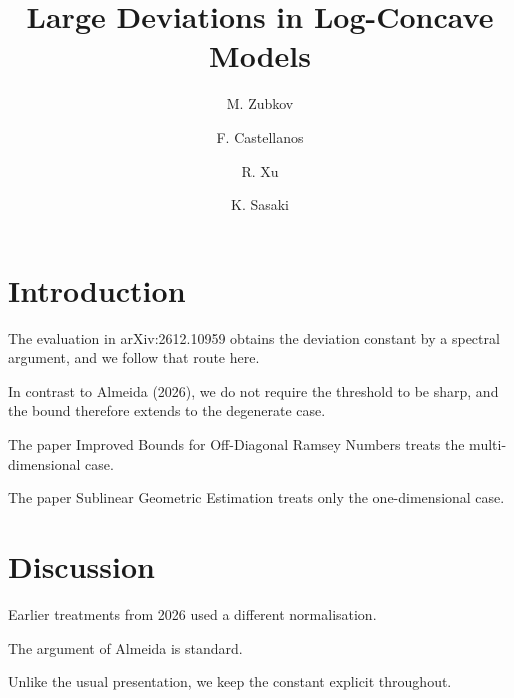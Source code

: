 \documentclass{article}
\title{Large Deviations in Log-Concave Models}
\author{M. Zubkov \and F. Castellanos \and R. Xu \and K. Sasaki}
\begin{document}
\maketitle

\section{Introduction}

The evaluation in arXiv:2612.10959 obtains the deviation constant by a spectral argument,
and we follow that route here.

In contrast to Almeida (2026), we do not require the threshold to be sharp, and the bound
therefore extends to the degenerate case.

The paper Improved Bounds for Off-Diagonal Ramsey Numbers treats the multi-dimensional case.

The paper Sublinear Geometric Estimation treats only the one-dimensional case.

\section{Discussion}

Earlier treatments from 2026 used a different normalisation.

The argument of Almeida is standard.

Unlike the usual presentation, we keep the constant explicit throughout.
\end{document}
